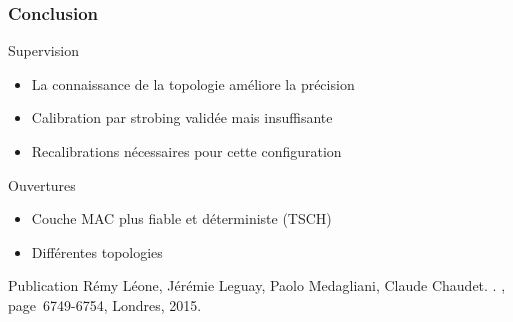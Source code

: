 \begin{frame}\frametitle{Conclusion}

  \begin{block}{Supervision}
      \begin{itemize}
        \item La connaissance de la topologie améliore la précision
        \item Calibration par strobing validée mais insuffisante
        \item Recalibrations nécessaires pour cette configuration
      \end{itemize}
  \end{block}

  \begin{block}{Ouvertures}
    \begin{itemize}
      \item Couche MAC plus fiable et déterministe (TSCH)
      \item Différentes topologies
    \end{itemize}
  \end{block}


\end{frame}

\begin{frame}{Publication}
    Rémy Léone, Jérémie Leguay, Paolo Medagliani, Claude Chaudet.
    .
    , page~6749-6754, Londres, 2015.
\end{frame}
